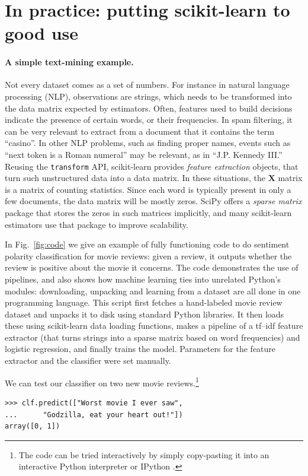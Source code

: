 \documentclass[a4paper]{article}
\begin{document}
\section{In practice: putting scikit-learn to good use}

\paragraph{A simple text-mining example.}
%
Not every dataset comes as a set of numbers. For instance in natural
language processing (NLP), observations are strings,
which needs to be transformed into the data matrix expected by
estimators. Often, features used to build decisions indicate the
presence of certain words, or their frequencies.
In spam filtering, it can be very relevant to extract from a document that
it contains the term ``casino''.
In other NLP problems, such as finding proper names,
events such as ``next token is a Roman numeral'' may be relevant, as in
``J.P. Kennedy III.''
Reusing the {\tt transform} API, scikit-learn
provides \emph{feature extraction} objects, that turn such
unstructured data into a data matrix. In these situations, the
$\textbf{X}$ matrix is a matrix of counting statistics.
Since each word is typically present in only a few documents,
the data matrix will be mostly zeros.
SciPy offers a \emph{sparse matrix} package
that stores the zeros in such matrices implicitly,
and many scikit-learn estimators use that package to improve scalability.

In Fig.~\ref{fig:code} we give an example of fully functioning code to
do sentiment polarity classification for movie reviews: given a review,
it outputs whether the review is positive about the movie it concerns.
The code demonstrates the use of pipelines, and also shows how machine
learning ties into unrelated Python's modules: downloading, unpacking and
learning from a dataset are all done in one programming language.
This script first fetches a hand-labeled movie review dataset
\cite{pang2004} and unpacks it to disk using standard Python libraries.
It then loads these using scikit-learn data loading functions, makes a
pipeline of a \textsf{tf--idf} feature extractor
\cite{rennie2003tackling} (that turns strings into a sparse matrix based
on word frequencies) and logistic regression, and finally trains the
model. Parameters for the feature extractor and the classifier
were set manually.

We can test our classifier on two new movie reviews.\footnote{
  The code can be tried interactively by simply copy-pasting it
  into an interactive Python interpreter or IPython \cite{perez2007ipython}.
}
\begin{lstlisting}
>>> clf.predict(["Worst movie I ever saw",
...      "Godzilla, eat your heart out!"])
array([0, 1])
\end{lstlisting}
\end{document}
